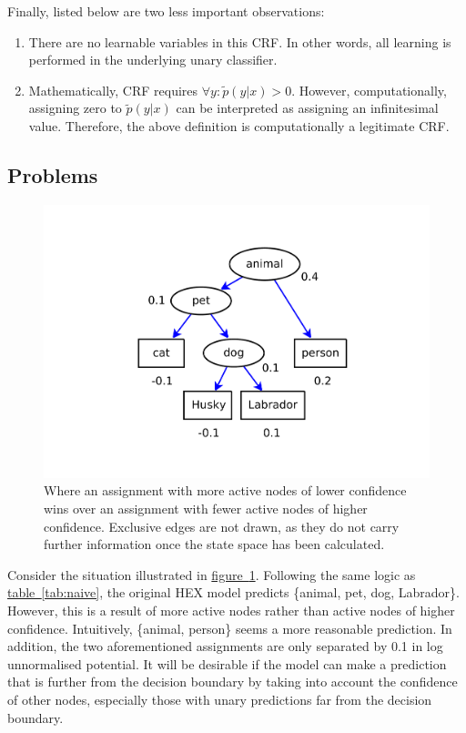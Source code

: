 \documentclass[11pt,a4paper]{article}
\begin{document}
Finally, listed below are two less important observations:
\begin{enumerate}
\item There are no learnable variables in this CRF. In other words, all learning is performed in the underlying unary classifier.
\item Mathematically, CRF requires $\forall y:\tilde{p}(y|x)>0$. However, computationally, assigning zero to $\tilde{p}(y|x)$ can be interpreted as assigning an infinitesimal value. Therefore, the above definition is computationally a legitimate CRF.
\end{enumerate}

\subsection{Problems}
\label{sec:problem}

\begin{figure}[htbp]
\centering\includegraphics[scale=0.5]{depth.pdf}
\caption{Where an assignment with more active nodes of lower confidence wins over an assignment with fewer active nodes of higher confidence. Exclusive edges are not drawn, as they do not carry further information once the state space has been calculated.}
\label{fig:depth}
\end{figure}

Consider the situation illustrated in \hyperref[fig:depth]{figure~\ref{fig:depth}}. Following the same logic as \hyperref[tab:naive]{table~\ref{tab:naive}}, the original HEX model predicts \{animal, pet, dog, Labrador\}. However, this is a result of more active nodes rather than active nodes of higher confidence. Intuitively, \{animal, person\} seems a more reasonable prediction. In addition, the two aforementioned assignments are only separated by 0.1 in log unnormalised potential. It will be desirable if the model can make a prediction that is further from the decision boundary by taking into account the confidence of other nodes, especially those with unary predictions far from the decision boundary.
\end{document}

